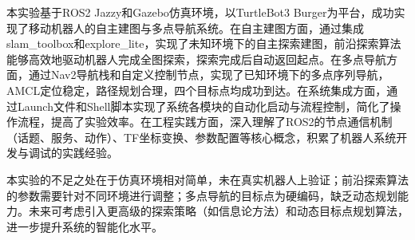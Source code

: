 \documentclass[a4paper,12pt]{article}
\begin{document}
本实验基于ROS2 Jazzy和Gazebo仿真环境，以TurtleBot3 Burger为平台，成功实现了移动机器人的自主建图与多点导航系统。在自主建图方面，通过集成slam\_toolbox和explore\_lite，实现了未知环境下的自主探索建图，前沿探索算法能够高效地驱动机器人完成全图探索，探索完成后自动返回起点。在多点导航方面，通过Nav2导航栈和自定义控制节点，实现了已知环境下的多点序列导航，AMCL定位稳定，路径规划合理，四个目标点均成功到达。在系统集成方面，通过Launch文件和Shell脚本实现了系统各模块的自动化启动与流程控制，简化了操作流程，提高了实验效率。在工程实践方面，深入理解了ROS2的节点通信机制（话题、服务、动作）、TF坐标变换、参数配置等核心概念，积累了机器人系统开发与调试的实践经验。

本实验的不足之处在于仿真环境相对简单，未在真实机器人上验证；前沿探索算法的参数需要针对不同环境进行调整；多点导航的目标点为硬编码，缺乏动态规划能力。未来可考虑引入更高级的探索策略（如信息论方法）和动态目标点规划算法，进一步提升系统的智能化水平。
\end{document}
